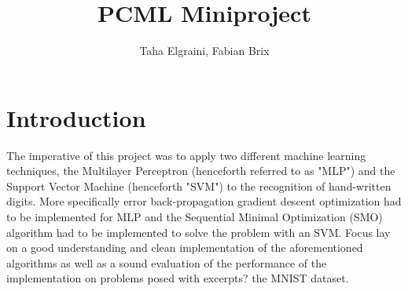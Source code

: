 \documentclass[10pt,a4paper]{article}
\title{PCML Miniproject}
\author{Taha Elgraini, Fabian Brix}
\begin{document}
\maketitle

\section{Introduction}
The imperative of this project was to apply two different machine learning techniques, the Multilayer Perceptron (henceforth referred to as "MLP") and the Support Vector Machine (henceforth "SVM") to the recognition of hand-written digits. More specifically error back-propagation gradient descent optimization had to be implemented for MLP and the Sequential Minimal Optimization (SMO) algorithm had to be implemented to solve the problem with an SVM. Focus lay on a good understanding and clean implementation of the aforementioned algorithms as well as a sound evaluation of the performance of the implementation on problems posed with excerpts? the MNIST dataset.


\end{document}
